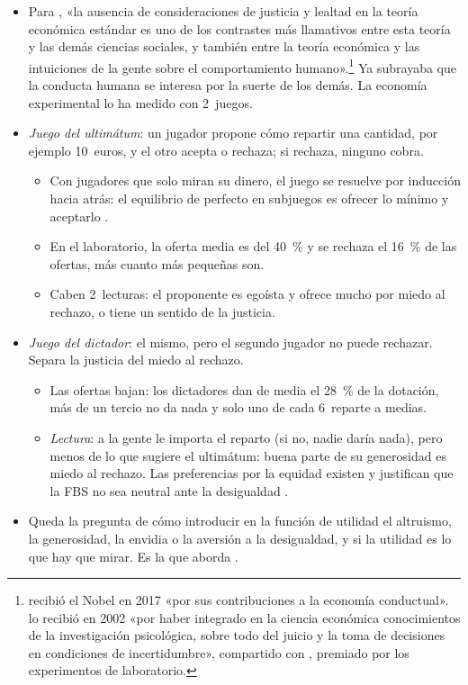 \documentclass[11pt]{article}
\begin{document}
\begin{itemize}
\item Para \textcite[S285]{KahnemanKnetschThaler1986Assumptions}, «la ausencia de consideraciones de justicia y lealtad en la teoría económica estándar es uno de los contrastes más llamativos entre esta teoría y las demás ciencias sociales, y también entre la teoría económica y las intuiciones de la gente sobre el comportamiento humano».\footnote{ recibió el Nobel en 2017 «por sus contribuciones a la economía conductual»\nocite{Nobel2017Thaler}.  lo recibió en 2002 «por haber integrado en la ciencia económica conocimientos de la investigación psicológica, sobre todo del juicio y la toma de decisiones en condiciones de incertidumbre», compartido con , premiado por los experimentos de laboratorio\nocite{Nobel2002Kahneman}.} Ya \textcite{Smith1759Theory} subrayaba que la conducta humana se interesa por la suerte de los demás. La economía experimental lo ha medido con 2~juegos.
\item \emph{Juego del ultimátum}\nocite{GuthSchmittbergerSchwarze1982Ultimatum}: un jugador propone cómo repartir una cantidad, por ejemplo 10~euros, y el otro acepta o rechaza; si rechaza, ninguno cobra.
  \begin{itemize}
  \item Con jugadores que solo miran su dinero, el juego se resuelve por inducción hacia atrás: el equilibrio de  perfecto en subjuegos es ofrecer lo mínimo y aceptarlo .
  \item En el laboratorio, la oferta media es del 40~\% y se rechaza el 16~\% de las ofertas, más cuanto más pequeñas son\nocite{OosterbeekSloofVandeKuilen2004Cultural}.
  \item Caben 2~lecturas: el proponente es egoísta y ofrece mucho por miedo al rechazo, o tiene un sentido de la justicia.
  \end{itemize}
\item \emph{Juego del dictador}\nocite{Forsythe1994Fairness}: el mismo, pero el segundo jugador no puede rechazar. Separa la justicia del miedo al rechazo.
  \begin{itemize}
  \item Las ofertas bajan: los dictadores dan de media el 28~\% de la dotación, más de un tercio no da nada y solo uno de cada 6~reparte a medias\nocite{Engel2011Dictator}.
  \item \emph{Lectura}: a la gente le importa el reparto (si no, nadie daría nada), pero menos de lo que sugiere el ultimátum: buena parte de su generosidad es miedo al rechazo. Las preferencias por la equidad existen y justifican que la FBS no sea neutral ante la desigualdad .
  \end{itemize}
\item Queda la pregunta de cómo introducir en la función de utilidad el altruismo, la generosidad, la envidia o la aversión a la desigualdad, y si la utilidad es lo que hay que mirar. Es la que aborda .
\end{itemize}
\end{document}
